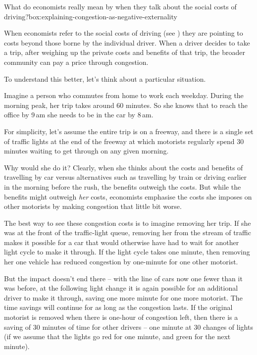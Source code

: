 \begin{bigbox}{What do economists really mean by when they talk about the social costs of driving?}{box:explaining-congestion-as-negative-externality}

When economists refer to the social costs of driving (see ) they are pointing to costs beyond those borne by the individual driver.
When a driver decides to take a trip, after weighing up the private costs and benefits of that trip, the broader community can pay a price through congestion.

To understand this better, let's think about a particular situation.

Imagine a person who commutes from home to work each weekday.
During the morning peak, her trip takes around 60 minutes.
So she knows that to reach the office by 9\,am she needs to be in the car by 8\,am.

For simplicity, let's assume the entire trip is on a freeway, and there is a single set of traffic lights at the end of the freeway at which motorists regularly spend 30 minutes waiting to get through on any given morning.

Why would she do it? Clearly, when she thinks about the costs and benefits of travelling by car versus alternatives such as travelling by train or driving  earlier in the morning before the rush, the benefits outweigh the costs.
But while the benefits might outweigh \textit{her} costs, economists emphasise the costs she imposes on other motorists by making congestion that little bit worse.

The best way to see these congestion costs is to imagine removing her trip.
If she was at the front of the traffic-light queue, removing her from the stream of traffic makes it possible for a car that would otherwise have had to wait for another light cycle to make it through.
If the light cycle takes one minute, then removing her one vehicle has reduced congestion by one-minute for one other motorist.

But the impact doesn't end there – with the line of cars now one fewer than it was before, at the following light change it is again possible for an additional driver to make it through, saving one more minute for one more motorist.
The time savings will continue for as long as the congestion lasts.
If the original motorist is removed when there is one-hour of congestion left, then there is a saving of 30 minutes of time for other drivers – one minute at 30 changes of lights (if we assume that the lights go red for one minute, and green for the next minute).


\end{bigbox}
